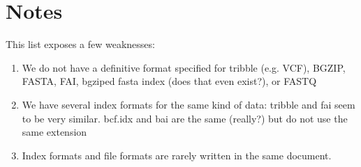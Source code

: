 \documentclass[a4paper]{article}
\begin{document}
\section{Notes}
This list exposes a few weaknesses:
\begin{enumerate}
\item We do not have a definitive format specified for tribble (e.g. VCF), BGZIP, FASTA, FAI, bgziped fasta index (does that even exist?), or FASTQ
\item We have several index formats for the same kind of data: tribble and fai seem to be very similar. bcf.idx and bai are the same (really?) but do not use the same extension
\item Index formats and file formats are rarely written in the same document.
\end{enumerate}
\end{document}
